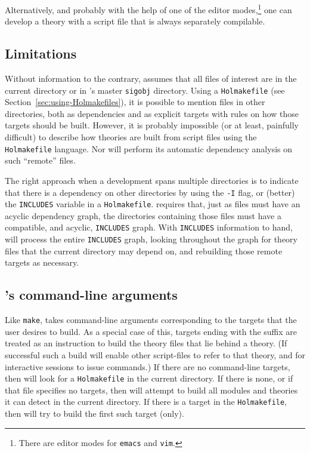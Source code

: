 Alternatively, and probably with the help of one of the editor modes,\footnote{There are editor modes for \texttt{emacs} and \texttt{vim}.} one can develop a theory with a script file that is always separately compilable.

\subsection{\holmake{} Limitations}

Without information to the contrary, \holmake{} assumes that all files of interest are in the current directory or in \HOL{}'s master \texttt{sigobj} directory.
Using a \texttt{Holmakefile} (see Section~\ref{sec:using-Holmakefiles}), it is possible to mention files in other directories, both as dependencies and as explicit targets with rules on how those targets should be built.
However, it is probably impossible (or at least, painfully difficult) to describe how theories are built from script files using the \texttt{Holmakefile} language.
Nor will \holmake{} perform its automatic dependency analysis on such ``remote'' files.

%
The right approach when a development spans multiple directories is to indicate that there is a dependency on other directories by using the \texttt{-I} flag, or (better) the \texttt{INCLUDES} variable in a \texttt{Holmakefile}.
\holmake{} requires that, just as files must have an acyclic dependency graph, the directories containing those files must have a compatible, and acyclic, \texttt{INCLUDES} graph.
With \texttt{INCLUDES} information to hand, \holmake{} will process the entire \texttt{INCLUDES} graph, looking throughout the graph for theory files that the current directory may depend on, and rebuilding those remote targets as necessary.

\subsection{\holmake{}'s command-line arguments}
Like {\tt make}, \holmake{} takes command-line arguments corresponding to the targets that the user desires to build.
As a special case of this, targets ending with the suffix  are treated as an instruction to build the theory files that lie behind a \HOL{} theory.
(If successful such a build will enable other script-files to refer to that theory, and for interactive sessions to issue  commands.)
If there are no command-line targets, then \holmake{} will look for a \texttt{Holmakefile} in the current directory.
If there is none, or if that file specifies no targets, then \holmake{} will attempt to build all \ML{} modules and \HOL{} theories it can detect in the current directory.
If there is a target in the \texttt{Holmakefile}, then \holmake{} will try to build the first such target (only).

